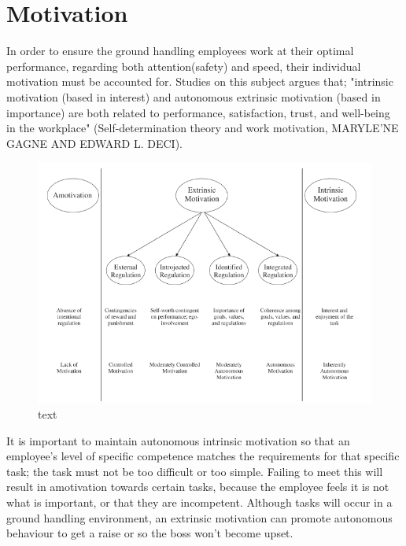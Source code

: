 \section{Motivation}

In order to ensure the ground handling employees work at their optimal performance, regarding both attention(safety) and speed, their individual motivation must be accounted for. Studies on this subject argues that; "intrinsic motivation (based in interest) and autonomous extrinsic motivation (based in importance) are both related to performance, satisfaction, trust, and well-being in the workplace" (Self-determination theory and work motivation, MARYLE'NE GAGNE AND EDWARD L. DECI).

\begin{figure}
\centering
\includegraphics[width=\textwidth]{Grafik/Motivation}
\caption{text}
\label{Hackman}
\end{figure}

It is important to maintain autonomous intrinsic motivation so that an employee's level of specific competence matches the requirements for that specific task; the task must not be too difficult or too simple. Failing to meet this will result in amotivation towards certain tasks, because the employee feels it is not what is important, or that they are incompetent. Although tasks will occur in a ground handling environment, an extrinsic motivation can promote autonomous behaviour to get a raise or so the boss won't become upset.

